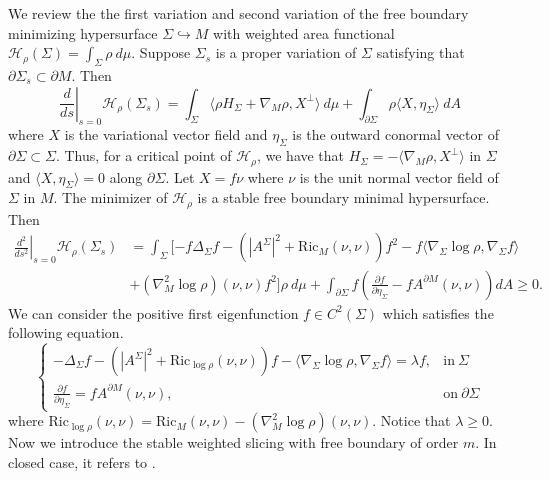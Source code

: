 \documentclass[11pt,letterpaper]{amsart}
\theoremstyle{definition}
\theoremstyle{remark}
\numberwithin{equation}{section}
\begin{document}
We review the the first variation and second variation of the free boundary minimizing hypersurface $\Sigma\hookrightarrow M$ with weighted area functional $ \mathcal{H}_{\rho}(\Sigma)=\int_{\Sigma}\rho\ d\mu$. Suppose $\Sigma_{s}$ is a proper variation of $\Sigma$ satisfying that $\partial \Sigma_{s}\subset \partial M$. Then
\[
\left.\frac{d}{ds}\right|_{s=0} \mathcal{H}_{\rho}(\Sigma_{s}) = \int_{\Sigma}\langle \rho H_{\Sigma}+\nabla_{M}\rho ,X^{\perp}\rangle\ d\mu+\int_{\partial \Sigma}\rho\langle X,\eta_\Sigma\rangle \ dA
\]
where $X$ is the variational vector field and $\eta_\Sigma$ is the outward conormal vector of $\partial \Sigma \subset \Sigma$.
Thus, for a critical point of $ \mathcal{H}_\rho$, we have that $H_{\Sigma}=-\langle \nabla_{M}\rho,X^{\perp}\rangle$ in $\Sigma$ and $\langle X,\eta_\Sigma \rangle = 0$ along $\partial \Sigma$. Let $X=f\nu$ where $\nu$ is the unit normal vector field of $\Sigma$ in $M$. The minimizer of $ \mathcal{H}_\rho$ is a stable free boundary minimal hypersurface. Then
\[
\begin{aligned}
\left.\frac{d^2}{ds^2}\right|_{s=0} \mathcal{H}_{\rho}(\Sigma_{s}) 
&= \int_{\Sigma}[-f\Delta_{\Sigma}f-(|A^{\Sigma}|^2+\text{Ric}_{M}(\nu,\nu))f^2-f\langle \nabla_{\Sigma}\log \rho,\nabla_{\Sigma}f\rangle\\
&+(\nabla^{2}_{M}\log \rho)(\nu,\nu)f^2]\rho \ d\mu+\int_{\partial \Sigma}f(\frac{\partial f}{\partial \eta_\Sigma}-fA^{\partial M}(\nu,\nu)) dA\geq 0.
\end{aligned}
\]
We can consider the positive first eigenfunction $f\in C^{2} (\Sigma)$ which satisfies the following equation.
\[
\left\{
\begin{array}{cc}
     -\Delta_{\Sigma}f-(|A^{\Sigma}|^2+\text{Ric}_{\log \rho}(\nu,\nu))f-\langle \nabla_{\Sigma}\log \rho,\nabla_{\Sigma}f\rangle = \lambda f, & \text{in}\ \Sigma \\
     \frac{\partial f}{\partial \eta_\Sigma} = fA^{\partial M}(\nu,\nu),& \text{on}\ \partial \Sigma 
\end{array}\right.
\]
where $\text{Ric}_{\log \rho}(\nu,\nu)=\text{Ric}_{M}(\nu,\nu)-(\nabla^{2}_{M}\log \rho)(\nu,\nu)$.
Notice that $\lambda\geq 0$.
Now we introduce the stable weighted slicing with free boundary of order $m$. In closed case, it refers to \cite{brendlegeroch'sconjecture}.
\end{document}
